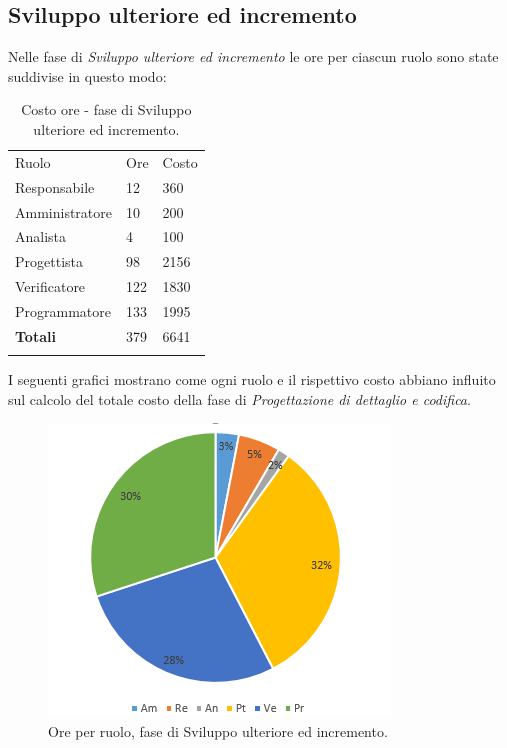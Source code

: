 \documentclass[a4paper]{article}
\begin{document}
		\subsection{Sviluppo ulteriore ed incremento}
			Nelle fase di \emph{Sviluppo ulteriore ed incremento} le ore per ciascun ruolo sono state suddivise in questo modo:
			\begin{table}[H]
				\begin{tabularx}{\textwidth}{Y Y Y}
					Ruolo & Ore & Costo \\
					Responsabile & 12 & 360 \\
					Amministratore & 10 & 200 \\
					Analista & 4 & 100\\
					Progettista & 98 & 2156\\
					Verificatore & 122 & 1830\\
					Programmatore & 133 & 1995 \\
					\textbf{Totali} & 379 & 6641 \\
				\end{tabularx}
				\caption{Costo ore - fase di Sviluppo ulteriore ed incremento. }
				\label{TCCodifica}
			\end{table}
			I seguenti grafici mostrano come ogni ruolo e il rispettivo costo abbiano influito sul calcolo del totale 
			costo della fase di \emph{Progettazione di dettaglio e codifica}.
			\begin{figure}[H]
				\centering
				\includegraphics[scale=0.7]{pc_incremento}
				\caption{Ore per ruolo, fase di Sviluppo ulteriore ed incremento.}
			\end{figure}
\end{document}
